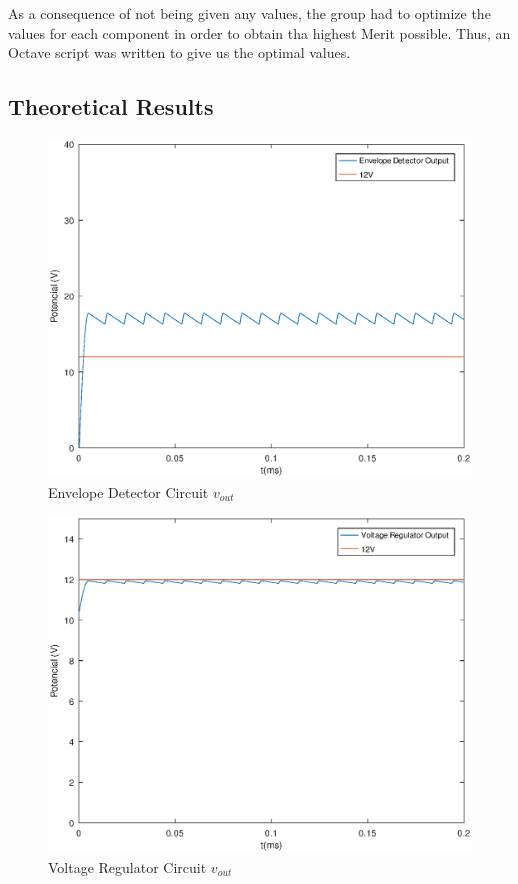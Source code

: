 As a consequence of not being given any values, the group had to optimize the values
for each component in order to obtain tha highest Merit possible. Thus, an Octave script
was written to give us the optimal values.



\subsection{Theoretical Results}
\label{subsec:res_the}

\begin{figure}[ht]
	\centering
	\includegraphics[width=1\linewidth]{envelope_detector.eps}
	\caption{Envelope Detector Circuit $v_{out}$}
\label{fig:EV_vout_a}
\end{figure}

\begin{figure}[ht]
	\centering
	\includegraphics[width=1\linewidth]{voltage_regulator.eps}
	\caption{Voltage Regulator Circuit $v_{out}$}
\label{fig:VR_vout_a}
\end{figure}

